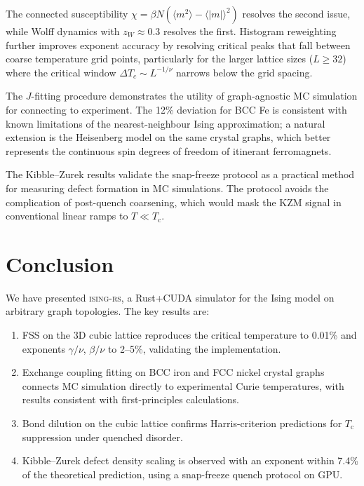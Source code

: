 \documentclass[twocolumn,showpacs,preprintnumbers,amsmath,amssymb,pra,floatfix]{revtex4-2}
\newcommand{\Tc}{T_{\mathrm{c}}}
\newcommand{\avg}[1]{\langle #1 \rangle}
\begin{document}
The connected susceptibility $\chi = \beta N(\avg{m^2} - \avg{|m|}^2)$ resolves
the second issue, while Wolff dynamics with $z_W \approx 0.3$ resolves the first.
Histogram reweighting further improves exponent accuracy by resolving critical
peaks that fall between coarse temperature grid points, particularly for the
larger lattice sizes ($L \geq 32$) where the critical window
$\Delta T_c \sim L^{-1/\nu}$ narrows below the grid spacing.

The $J$-fitting procedure demonstrates the utility of graph-agnostic MC simulation
for connecting to experiment. The 12\% deviation for BCC Fe is consistent with
known limitations of the nearest-neighbour Ising approximation; a natural extension
is the Heisenberg model on the same crystal graphs, which better represents the
continuous spin degrees of freedom of itinerant ferromagnets.

The Kibble--Zurek results validate the snap-freeze protocol as a practical method
for measuring defect formation in MC simulations. The protocol avoids the
complication of post-quench coarsening, which would mask the KZM signal in
conventional linear ramps to $T \ll \Tc$.

\section{Conclusion}
\label{sec:conclusion}

We have presented \textsc{ising-rs}, a Rust+CUDA simulator for the Ising model on
arbitrary graph topologies. The key results are:

\begin{enumerate}
\item FSS on the 3D cubic lattice reproduces the critical temperature to 0.01\%
and exponents $\gamma/\nu$, $\beta/\nu$ to 2--5\%, validating the implementation.

\item Exchange coupling fitting on BCC iron and FCC nickel crystal graphs connects
MC simulation directly to experimental Curie temperatures, with results consistent
with first-principles calculations.

\item Bond dilution on the cubic lattice confirms Harris-criterion predictions for
$\Tc$ suppression under quenched disorder.

\item Kibble--Zurek defect density scaling is observed with an exponent within
7.4\% of the theoretical prediction, using a snap-freeze quench protocol on GPU.
\end{enumerate}
\end{document}
